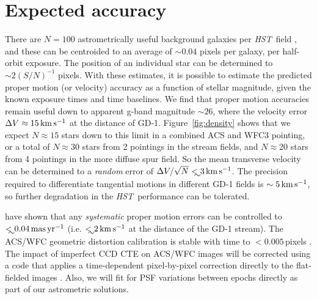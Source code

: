 \documentclass[12pt]{article}
\newcommand{\hst}{\textsl{HST}}
\begin{document}
\section*{Expected accuracy}
There are $N=100$ astrometrically useful background galaxies per \hst\ field \parencite[e.g.,][]{sohn2012,sohn2013}, and these can be centroided to an average of $\sim0.04$ pixels per galaxy, per half-orbit exposure.
The position of an individual star can be determined to $\sim2(S/N)^{-1}$ pixels.
With these estimates, it is possible to estimate the predicted proper motion (or velocity) accuracy as a function of stellar magnitude, given the known exposure times and time baselines.
We find that proper motion accuracies remain useful down to apparent g-band magnitude $\sim26$, where the velocity error $\Delta V\approx15\,\rm km\,s^{-1}$ at the distance of GD-1.
Figure~\ref{fig:density} shows that we expect $N\approx15$ stars down to this limit in a combined ACS and WFC3 pointing, or a total of $N\approx30$ stars from 2 pointings in the stream fields, and $N\approx20$ stars from 4 pointings in the more diffuse spur field. 
So the mean transverse velocity can be determined to a \emph{random} error of $\Delta V/\sqrt{N}\lesssim3\,\rm km\,s^{-1}$.
The precision required to differentiate tangential motions in different GD-1 fields is $\sim5\,\rm km\,s^{-1}$, so further degradation in the \hst\ performance can be tolerated.
 
\textcite{sohn2012, sohn2013} have shown that any \emph{systematic} proper motion errors can be controlled to $\lesssim0.04\,\rm mas\,yr^{-1}$ (i.e. $\lesssim2\,\rm km\,s^{-1}$ at the distance of the GD-1 stream).
The ACS/WFC geometric distortion calibration is stable with time to $<0.005$\,pixels \parencite{anderson2007}.
The impact of imperfect CCD CTE on ACS/WFC images will be corrected using a code that applies a time-dependent pixel-by-pixel correction directly to the flat-fielded images \parencite{andersonbedin2010}.
Also, we will fit for PSF variations between epochs directly as part of our astrometric solutions.
\end{document}
